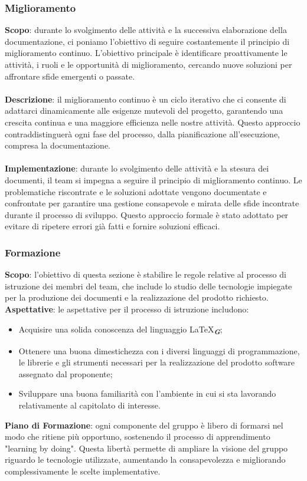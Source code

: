 \subsubsection{Miglioramento}
\textbf{Scopo}: durante lo svolgimento delle attività e la successiva elaborazione della documentazione, ci poniamo l'obiettivo di seguire costantemente il principio di miglioramento continuo. 
L'obiettivo principale è identificare proattivamente le attività, i ruoli e le opportunità di miglioramento, cercando nuove soluzioni per affrontare sfide emergenti o passate.\\ \\
\textbf{Descrizione}: il miglioramento continuo è un ciclo iterativo che ci consente di adattarci dinamicamente alle esigenze mutevoli del progetto, 
garantendo una crescita continua e una maggiore efficienza nelle nostre attività.
Questo approccio contraddistinguerà ogni fase del processo, dalla pianificazione all'esecuzione, compresa la documentazione.\\ \\
\textbf{Implementazione}: durante lo svolgimento delle attività e la stesura dei documenti, il team si impegna a seguire il principio di miglioramento continuo. 
Le problematiche riscontrate e le soluzioni adottate vengono documentate e confrontate per garantire una gestione consapevole e mirata delle sfide incontrate durante il processo di sviluppo. 
Questo approccio formale è stato adottato per evitare di ripetere errori già fatti e fornire soluzioni efficaci.

\subsubsection{Formazione}
\textbf{Scopo}: l'obiettivo di questa sezione è stabilire le regole relative al processo di istruzione dei membri del team, 
che include lo studio delle tecnologie impiegate per la produzione dei documenti e la realizzazione del prodotto richiesto.
\textbf{Aspettative}: le aspettative per il processo di istruzione includono:
\begin{itemize}
    \item Acquisire una solida conoscenza del linguaggio \LaTeX\textsubscript{\textit{\textbf{G}}};
    \item Ottenere una buona dimestichezza con i diversi linguaggi di programmazione, le librerie e gli strumenti necessari per la realizzazione del prodotto software assegnato dal proponente;
    \item Sviluppare una buona familiarità con l'ambiente in cui si sta lavorando relativamente al capitolato di interesse.
\end{itemize}
\textbf{Piano di Formazione}: ogni componente del gruppo è libero di formarsi nel modo che ritiene più opportuno, sostenendo il processo di apprendimento "learning by doing". Questa libertà permette di ampliare la visione del gruppo riguardo le tecnologie utilizzate, aumentando la consapevolezza e migliorando complessivamente le scelte implementative.
